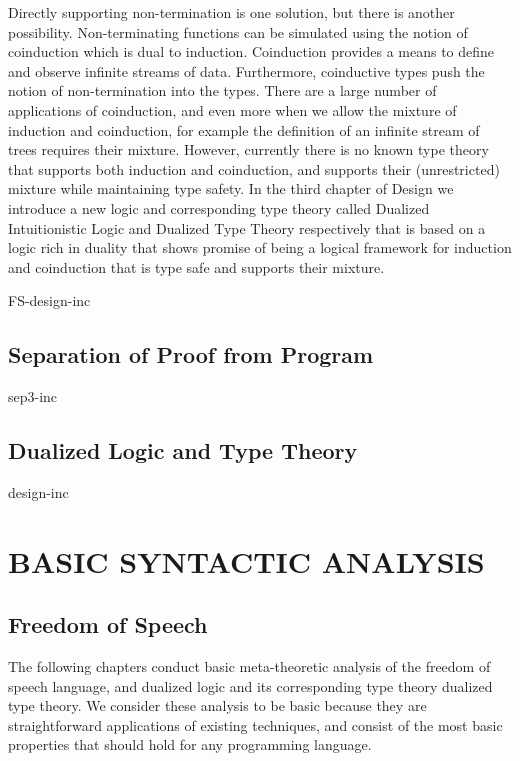 \documentclass[phd,appendix,dedicationpage,ackpage,epigraphpage,figures]{uithesis}
\begin{document}
Directly supporting non-termination is one solution, but there is
another possibility.  Non-terminating functions can be simulated using
the notion of coinduction which is dual to induction.  Coinduction
provides a means to define and observe infinite streams of data.
Furthermore, coinductive types push the notion of non-termination into
the types. There are a large number of applications of coinduction,
and even more when we allow the mixture of induction and coinduction,
for example the definition of an infinite stream of trees requires
their mixture.  However, currently there is no known type theory that
supports both induction and coinduction, and supports their
(unrestricted) mixture while maintaining type safety.  In the third
chapter of Design we introduce a new logic and corresponding type
theory called Dualized Intuitionistic Logic and Dualized Type Theory
respectively that is based on a logic rich in duality that shows
promise of being a logical framework for induction and coinduction
that is type safe and supports their mixture.

{FS-design-inc}

\chapter{Separation of Proof from Program}
\label{chap:separation_of_proof_from_program}
{sep3-inc}
\chapter{Dualized Logic and Type Theory}
\label{chap:dualized_type_theory_de}
{design-inc}

\part{BASIC SYNTACTIC ANALYSIS}
\label{part:basic-analysis}

\chapter{Freedom of Speech}
\label{chap:freedom_of_speech_anal}
The following chapters conduct basic meta-theoretic analysis of the
freedom of speech language, and dualized logic and its corresponding
type theory dualized type theory.  We consider these analysis to be
basic because they are straightforward applications of existing
techniques, and consist of the most basic properties that should hold
for any programming language.
\end{document}
